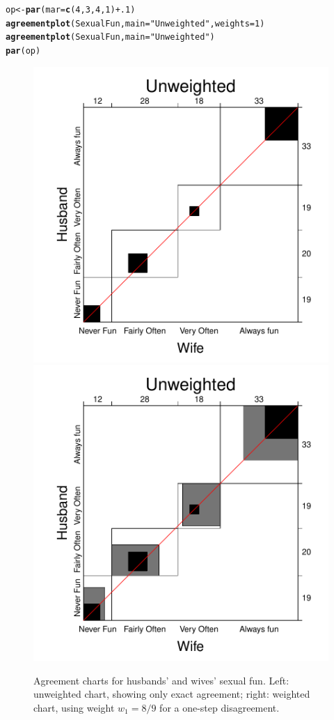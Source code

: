 \documentclass[11pt]{book}\usepackage[]{graphicx}\usepackage[]{color}
\makeatletter
\newcommand{\hlnum}[1]{\textcolor[rgb]{0.686,0.059,0.569}{#1}}%
\newcommand{\hlstr}[1]{\textcolor[rgb]{0.192,0.494,0.8}{#1}}%
\newcommand{\hlopt}[1]{\textcolor[rgb]{0,0,0}{#1}}%
\newcommand{\hlstd}[1]{\textcolor[rgb]{0.345,0.345,0.345}{#1}}%
\newcommand{\hlkwb}[1]{\textcolor[rgb]{0.69,0.353,0.396}{#1}}%
\newcommand{\hlkwc}[1]{\textcolor[rgb]{0.333,0.667,0.333}{#1}}%
\newcommand{\hlkwd}[1]{\textcolor[rgb]{0.737,0.353,0.396}{\textbf{#1}}}%
\newenvironment{kframe}{%
 \def\at@end@of@kframe{}%
 \ifinner\ifhmode%
  \def\at@end@of@kframe{\end{minipage}}%
  \begin{minipage}{\columnwidth}%
 \fi\fi%
 \def\FrameCommand##1{\hskip\@totalleftmargin \hskip-\fboxsep
 \colorbox{shadecolor}{##1}\hskip-\fboxsep
     \hskip-\linewidth \hskip-\@totalleftmargin \hskip\columnwidth}%
 \MakeFramed {\advance\hsize-\width
   \@totalleftmargin\z@ \linewidth\hsize
   \@setminipage}}%
 {\par\unskip\endMakeFramed%
 \at@end@of@kframe}
\newenvironment{knitrout}{}{} %
\renewenvironment{knitrout}{\small\renewcommand{\baselinestretch}{.85}}{} %
\makeatother
\begin{document}
\begin{knitrout}
\color{fgcolor}\begin{kframe}
\begin{alltt}
\hlstd{op} \hlkwb{<-} \hlkwd{par}\hlstd{(}\hlkwc{mar}\hlstd{=}\hlkwd{c}\hlstd{(}\hlnum{4}\hlstd{,}\hlnum{3}\hlstd{,}\hlnum{4}\hlstd{,}\hlnum{1}\hlstd{)}\hlopt{+}\hlnum{.1}\hlstd{)}
\hlkwd{agreementplot}\hlstd{(SexualFun,} \hlkwc{main}\hlstd{=}\hlstr{"Unweighted"}\hlstd{,} \hlkwc{weights}\hlstd{=}\hlnum{1}\hlstd{)}
\hlkwd{agreementplot}\hlstd{(SexualFun,} \hlkwc{main}\hlstd{=}\hlstr{"Unweighted"}\hlstd{)}
\hlkwd{par}\hlstd{(op)}
\end{alltt}
\end{kframe}\begin{figure}[htbp]


\centerline{\includegraphics[width=.48\textwidth]{ch04/fig/sexfun-agree1} 
\includegraphics[width=.48\textwidth]{ch04/fig/sexfun-agree2} }

\caption[Agreement charts for husbands' and wives' sexual fun]{Agreement charts for husbands' and wives' sexual fun. Left: unweighted chart, showing only exact agreement; right: weighted chart, using weight $w_1 = 8/9$ for a one-step disagreement.\label{fig:sexfun-agree}}
\end{figure}


\end{knitrout}
\end{document}
